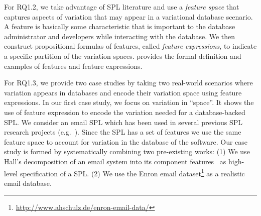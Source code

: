 \begin{comment}
* introduce a feature space
* propositional formulas of features
\end{comment}

For RQ1.2, we take advantage of SPL literature and use a \emph{feature space} 
that captures aspects of 
variation that may appear in a variational database scenario. A feature is
basically some characteristic that is important to the database administrator
and developers while interacting with the database.
We then construct propositional formulas of features, called \emph{feature expressions},
to indicate a specific partition of the variation spaces.
 provides the formal definition and examples of
features and feature expressions.


For RQ1.3, we provide two case studies by taking 
two real-world scenarios where variation appears
in databases and encode their variation space using feature expressions.
%
In our first case study, we focus on variation in ``space''.
It shows the use of feature expression to encode the variation
needed for a database-backed SPL. We consider an email
SPL which has been used in several previous SPL research projects (e.g.\
\cite{Apel13:SSP,AlHaj19}).
Since the SPL has a set of features we use the same feature space 
to account for variation in the database of the software.
%
%
Our case study is formed by systematically combining two pre-existing works:
%
%
(1) We use Hall's decomposition of an email system into its component
features~\cite{Hall05} as high-level specification of a SPL.
%
(2) We use the Enron email
dataset\footnote{\url{http://www.ahschulz.de/enron-email-data/}} as 
a realistic email database.



